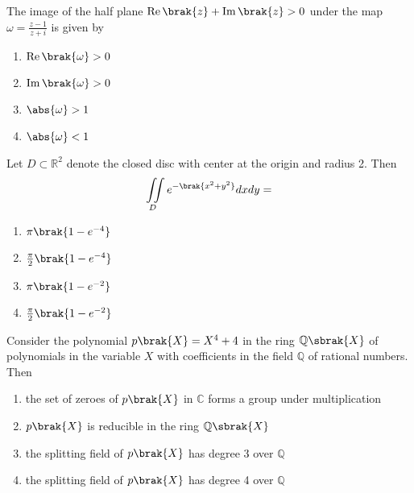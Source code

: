 \iffalse
	\title{2018}
	\author{ee24btech11027}
	\section{ma}
	\chapter{2018}
\fi
\item  The image of the half plane $\operatorname{Re}\brak{z}+\operatorname{Im}\brak{z}>0$ under the map $\omega=\frac{z-1}{z+i}$ is given by 
\begin{multicols}{4}
\begin{enumerate}
    \item $\operatorname{Re}\brak{\omega}>0$
    \item $\operatorname{Im}\brak{\omega}>0$
    \item $\abs{\omega}>1$
    \item $\abs{\omega}<1$
\end{enumerate}
\end{multicols}
\item Let $D \subset \mathbb{R}^2$ denote the closed disc with center at the origin and radius 2. Then
\begin{align*}
    \displaystyle \iint\limits_{D} e^{-\brak{x^2+y^2}}dxdy=
\end{align*}
\begin{multicols}{4}
    \begin{enumerate}
        \item $\pi\brak{1-e^{-4}}$
        \item $\frac{\pi}{2}\brak{1-e^{-4}}$
        \item $\pi\brak{1-e^{-2}}$
        \item $\frac{\pi}{2}\brak{1-e^{-2}}$
    \end{enumerate}
\end{multicols}
\item Consider the polynomial $p\brak{X}=X^4+4$ in the ring $\mathbb{Q}\sbrak{X}$ of polynomials in the variable $X$ with coefficients in the field $\mathbb{Q}$ of rational numbers. Then
\begin{enumerate}
	\item the set of zeroes of $p\brak{X}$ in $\mathbb{C}$ forms a group under multiplication
    \item $p\brak{X}$ is reducible in the ring $\mathbb{Q}\sbrak{X}$
    \item the splitting field of $p\brak{X}$ has degree 3 over $\mathbb{Q}$
    \item the splitting field of $p\brak{X}$ has degree 4 over $\mathbb{Q}$
\end{enumerate}

